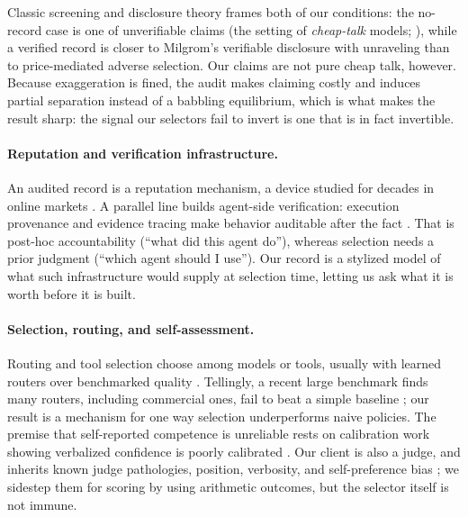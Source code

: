 \documentclass[11pt]{article}
\begin{document}
Classic screening and disclosure theory frames both
of our conditions: the no-record case is one of unverifiable claims (the
setting of \emph{cheap-talk} models; \citealp{crawford1982strategic,farrell1996cheaptalk}),
while a verified record is closer to Milgrom's verifiable disclosure with unraveling
\cite{milgrom1981goodnews} than to price-mediated adverse selection. Our claims are not pure
cheap talk, however. Because exaggeration is fined, the audit makes claiming costly and
induces partial separation instead of a babbling equilibrium, which is what makes the result
sharp: the signal our selectors fail to invert is one that is in fact invertible.

\paragraph{Reputation and verification infrastructure.} An audited record is a
reputation mechanism, a device studied for decades in online markets
\cite{resnick2002trust,dellarocas2003digitization}. A parallel line builds agent-side
verification: execution provenance and evidence tracing make behavior auditable after
the fact \cite{wang2026traces}. That is post-hoc accountability (``what did this agent
do''), whereas selection needs a prior judgment (``which agent should I use''). Our
record is a stylized model of what such infrastructure would supply at selection time,
letting us ask what it is worth before it is built.

\paragraph{Selection, routing, and self-assessment.} Routing and tool selection choose
among models or tools, usually with learned routers over benchmarked quality
\cite{ong2024routellm,patil2023gorilla}. Tellingly, a recent large benchmark finds many
routers, including commercial ones, fail to beat a simple baseline
\cite{li2026llmrouterbench}; our result is a mechanism for one way selection underperforms
naive policies. The premise that self-reported competence is unreliable rests on
calibration work showing verbalized confidence is poorly calibrated
\cite{kadavath2022know,xiong2024uncertainty}. Our client is also a judge, and inherits
known judge pathologies, position, verbosity, and self-preference bias
\cite{zheng2023judging,panickssery2024selfpreference}; we sidestep them for scoring by
using arithmetic outcomes, but the selector itself is not immune.
\end{document}
